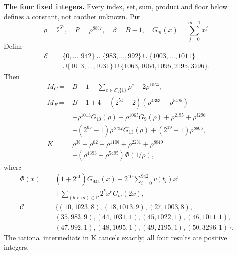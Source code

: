 \documentclass[11pt,letterpaper]{article}
\newcommand{\rg}[2]{\{#1,\ldots,#2\}}
\theoremstyle{definition}
\theoremstyle{remark}
\begin{document}
\textbf{The four fixed integers.}
Every index, set, sum, product and floor below defines a constant, not
another unknown. Put
\[
\rho=2^{67},\quad B=\rho^{8807},\quad\beta=B-1,\quad
G_m(x)=\sum_{j=0}^{m-1}x^j.
\]
Define
\[
\begin{split}
\mathcal E={}&\rg0{942}\cup\rg{983}{992}\cup\rg{1003}{1011}\\
&\cup\rg{1013}{1031}\cup\{1063,1064,1095,2195,3296\}.
\end{split}
\]
Then
\begin{align*}
M_C={}&B-1-\sum_{e\in\mathcal E\setminus\{1\}}\rho^e-2\rho^{1063},\\
M_F={}&B-1+4+(2^{51}-2)(\rho^{4393}+\rho^{5495})\\
&+\rho^{1013}G_{10}(\rho)+\rho^{1065}G_9(\rho)
  +\rho^{2195}+\rho^{3296}\\
&+(2^{65}-1)\rho^{8792}G_{13}(\rho)+(2^{19}-1)\rho^{8805},\\
K={}&\rho^{30}+\rho^{62}+\rho^{1100}+\rho^{2201}+\rho^{8849}\\
&+(\rho^{4393}+\rho^{5495})\Phi(1/\rho),
\end{align*}
where
\[
\begin{split}
\Phi(x)={}&(1+2^{51})G_{943}(x)
 -2^{10}\sum_{i=0}^{942}v(t_i)x^i\\
&+\sum_{(b,e,m)\in\mathcal C}2^b x^e G_m(2x),\\
\mathcal C={}&\{(10,1023,8),(18,1013,9),(27,1003,8),\\
&(35,983,9),(44,1031,1),(45,1022,1),(46,1011,1),\\
&(47,992,1),(48,1095,1),(49,2195,1),(50,3296,1)\}.
\end{split}
\]
The rational intermediate in K cancels exactly; all four results are positive integers.
\end{document}
